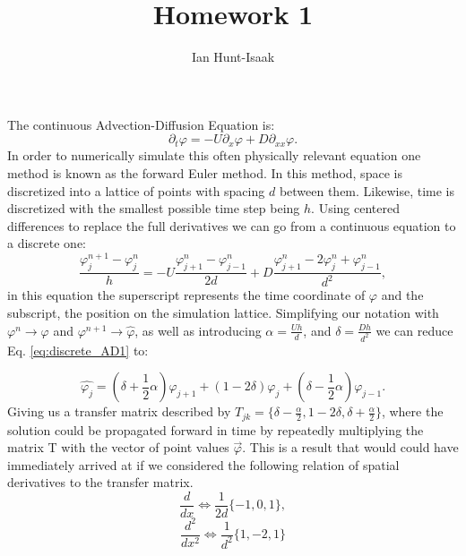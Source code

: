\documentclass[]{article}
\title{Homework 1}
\author{Ian Hunt-Isaak}
\date{}
\begin{document}
\maketitle

\section{}
The continuous Advection-Diffusion Equation is:
\begin{equation}
\partial_t \varphi = -U \partial_x \varphi + D \partial_{xx}\varphi.
\label{eq:AD_cont}
\end{equation}
In order to numerically simulate this often physically relevant equation one method is known as the forward Euler method. In this method, space is discretized into a lattice of points with spacing $d$ between them. Likewise, time is discretized with the smallest possible time step being $h$. Using centered differences to replace the full derivatives we can go from a continuous equation to a discrete one:
\begin{equation}
\frac{\varphi^{n+1}_j-\varphi^n_j}{h} = -U \frac{\varphi^n_{j+1}-\varphi^n_{j-1}}{2d} + D \frac{\varphi^n_{j+1}-2\varphi^n_{j}+\varphi^n_{j-1}}{d^2},
\label{eq:discrete_AD1}
\end{equation}
in this equation the superscript represents the time coordinate of $\varphi$ and the subscript, the position on the simulation lattice. Simplifying our notation with $\varphi^n \to \varphi$ and $\varphi^{n+1} \to \hat{\varphi}$, as well as introducing $\alpha = \frac{Uh}{d}$, and $\delta=\frac{Dh}{d^2}$  we can reduce Eq. \ref{eq:discrete_AD1} to:

\begin{equation}
	\hat{\varphi_j} = (\delta+\frac{1}{2}\alpha)\varphi_{j+1} +(1-2\delta)\varphi_{j}+(\delta-\frac{1}{2}\alpha)\varphi_{j-1}. 
	\label{eq:discrete_AD2}
\end{equation}
Giving us a transfer matrix described by $T_{jk} = \{\delta-\frac{\alpha}{2},1-2\delta,\delta+\frac{\alpha}{2}\}$, where the solution could be propagated forward in time by repeatedly multiplying the matrix T with the vector of point values $\vec{\varphi}$. 
This is a result that would could have immediately arrived at if we considered the following relation of spatial derivatives to the transfer matrix.
\begin{equation}
\frac{d}{dx} \Leftrightarrow \frac{1}{2d}\{-1,0,1\},
\label{eq:dx}
\end{equation}
\begin{equation}
\frac{d^2}{dx^2} \Leftrightarrow \frac{1}{d^2}\{1,-2,1\}
\label{eq:dx^2}
\end{equation}
\end{document}
